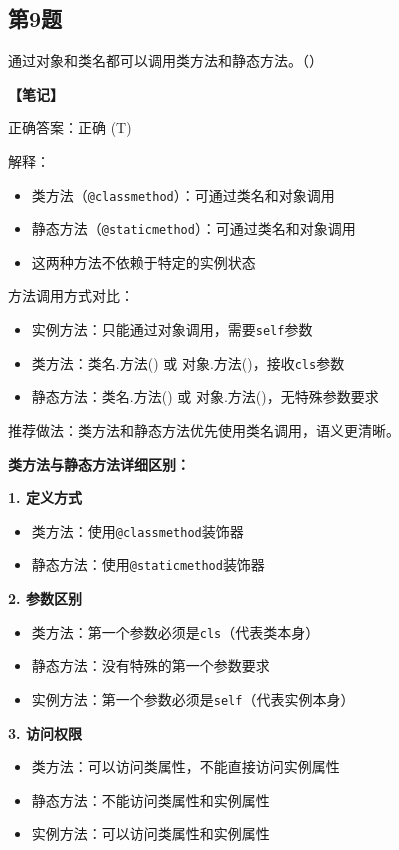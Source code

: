   \subsection{第9题}
  通过对象和类名都可以调用类方法和静态方法。（\quad）

  \begin{mdframed}[linewidth=1pt, linecolor=black]
    \textbf{\color{red}【笔记】}

    正确答案：正确 (T)

    解释：
    \begin{itemize}
      \item 类方法（\texttt{@classmethod}）：可通过类名和对象调用
      \item 静态方法（\texttt{@staticmethod}）：可通过类名和对象调用
      \item 这两种方法不依赖于特定的实例状态
    \end{itemize}

    方法调用方式对比：
    \begin{itemize}
      \item 实例方法：只能通过对象调用，需要\texttt{self}参数
      \item 类方法：类名.方法() 或 对象.方法()，接收\texttt{cls}参数
      \item 静态方法：类名.方法() 或 对象.方法()，无特殊参数要求
    \end{itemize}

    推荐做法：类方法和静态方法优先使用类名调用，语义更清晰。

    \textbf{类方法与静态方法详细区别：}

    \textbf{1. 定义方式}
    \begin{itemize}
      \item 类方法：使用\texttt{@classmethod}装饰器
      \item 静态方法：使用\texttt{@staticmethod}装饰器
    \end{itemize}

    \textbf{2. 参数区别}
    \begin{itemize}
      \item 类方法：第一个参数必须是\texttt{cls}（代表类本身）
      \item 静态方法：没有特殊的第一个参数要求
      \item 实例方法：第一个参数必须是\texttt{self}（代表实例本身）
    \end{itemize}

    \textbf{3. 访问权限}
    \begin{itemize}
      \item 类方法：可以访问类属性，不能直接访问实例属性
      \item 静态方法：不能访问类属性和实例属性
      \item 实例方法：可以访问类属性和实例属性
    \end{itemize}


\end{mdframed}
